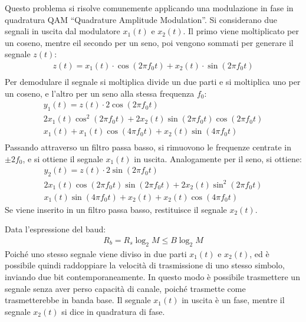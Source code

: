 \documentclass{article}
\numberwithin{equation}{subsection}
\begin{document}
Questo problema si risolve comunemente applicando una modulazione in fase in quadratura QAM ``Quadrature Amplitude Modulation''. 
Si considerano due segnali in uscita dal modulatore $x_1(t)$ e $x_2(t)$. %
Il primo viene moltiplicato per un coseno, mentre eil secondo per un 
seno, poi vengono sommati per generare il segnale $z(t)$:
\begin{gather*}
    z(t)=x_1(t)\cdot\cos(2\pi f_0t)+x_2(t)\cdot\sin(2\pi f_0t)\\
\end{gather*}
Per demodulare il segnale si moltiplica divide un due parti e si moltiplica uno per un coseno, e l'altro per un seno alla stessa frequenza $f_0$:
\begin{gather*}
    y_1(t)=z(t)\cdot2\cos(2\pi f_0t)\\
    2x_1(t)\cos^2(2\pi f_0t)+2x_2(t)\sin(2\pi f_0t)\cos(2\pi f_0t)\\
    x_1(t)+x_1(t)\cos(4\pi f_0t)+x_2(t)\sin(4\pi f_0t)\\
\end{gather*}
Passando attraverso un filtro passa basso, si rimuovono le frequenze centrate in $\pm 2f_0$, e si ottiene il segnale $x_1(t)$ in uscita. 
Analogamente per il seno, si ottiene:
\begin{gather*}
    y_2(t)=z(t)\cdot2\sin(2\pi f_0t)\\
    2x_1(t)\cos(2\pi f_0t)\sin(2\pi f_0t)+2x_2(t)\sin^2(2\pi f_0t)\\
    x_1(t)\sin(4\pi f_0t)+x_2(t)+x_2(t)\cos(4\pi f_0t)
\end{gather*}
Se viene inserito in un filtro passa basso, restituisce il segnale $x_2(t)$. 

Data l'espressione del baud:
\begin{gather*}
    R_b=R_s\log_2M\leq B\log_2M
\end{gather*}
Poiché uno stesso segnale viene diviso in due parti $x_1(t)$ e $x_2(t)$, ed è possibile quindi raddoppiare la velocità di trasmissione di uno stesso simbolo, 
inviando due bit contemporaneamente. 
In questo modo è possibile trasmettere un segnale senza aver perso capacità di canale, poiché trasmette come trasmetterebbe in banda base. Il segnale $x_1(t)$ in 
uscita è un fase, mentre il segnale $x_2(t)$ si dice in quadratura di fase. 
\end{document}
